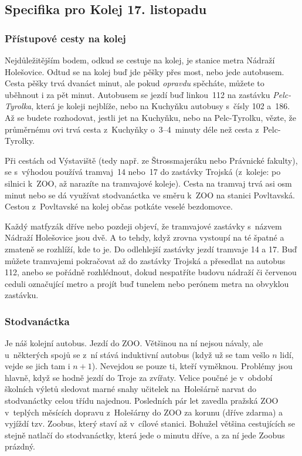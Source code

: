 \subsection{Specifika pro Kolej 17. listopadu}
\medskip
\subsubsection{Přístupové cesty na kolej}

Nejdůležitějším bodem, odkud se cestuje na kolej, je stanice metra
Nádraží Holešovice. Odtud se na kolej buď jde pěšky přes most,
nebo jede autobusem. Cesta pěšky trvá dvanáct minut, ale pokud
\emph{opravdu\/} spěcháte, můžete to uběhnout i za pět minut.
Autobusem se jezdí buď linkou~112 na zastávku \emph{Pelc-Tyrolka},
která je koleji nejblíže, nebo na Kuchyňku autobusy s~čísly 102
a~186. Až se budete rozhodovat, jestli jet na Kuchyňku, nebo na
Pelc-Tyrolku, vězte, že průměrnému \mfk{}ovi trvá cesta z~Kuchyňky
o~3--4~minuty déle než cesta z~Pelc-Tyrolky.

Při cestách od Výstaviště (tedy např. ze Štrossmajeráku nebo
Právnické fakulty), se s~výhodou používá tramvaj~14 nebo~17 do
zastávky Trojská (z~koleje: po silnici k~ZOO, až narazíte na
tramvajové koleje). Cesta na tramvaj trvá asi osm minut nebo se dá
využívat stodvanáctka ve směru k~ZOO na stanici Povltavská. Cestou z~Povltavské na kolej občas potkáte veselé bezdomovce.

Každý matfyzák dříve nebo pozdeji objeví, že tramvajové zastávky s~názvem Nádraží Holešovice jsou dvě. A to tehdy, když zrovna vystoupí na té špatné a zmateně se rozhlíží, kde to je. Do odlehlejší zastávky jezdí tramvaje 14 a 17. Buď můžete tramvajemi pokračovat až do zastávky Trojská a přesedlat na autobus 112, anebo se pořádně rozhlédnout, dokud nespatříte budovu nádraží či červenou ceduli označující metro a projít buď tunelem nebo perónem metra na obvyklou zastávku.

\subsubsection {Stodvanáctka}

Je náš kolejní autobus. Jezdí do ZOO. Většinou na ní nejsou
návaly, ale u~některých spojů se z~ní stává induktivní autobus
(když už se tam vešlo $n$ lidí, vejde se jich tam i $n+1$).
Nevejdou se pouze ti, kteří vyměknou. Problémy jsou hlavně, když
se hodně jezdí do Troje za zvířaty. Velice poučné je v~období
školních výletů sledovat marné snahy učitelek na~Holešárně narvat
do stodvanáctky celou třídu najednou. Posledních pár let zavedla
pražská ZOO v~teplých měsících dopravu z~Holešárny do ZOO za
korunu (dříve zdarma) a vyjíždí tzv. Zoobus, který staví až
v~cílové stanici. Bohužel většina cestujících se stejně natlačí do
stodvanáctky, která jede o minutu dříve, a za ní jede Zoobus
prázdný.
